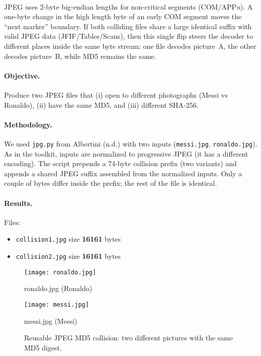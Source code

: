 \documentclass[runningheads]{llncs}
\begin{document}
    \paragraph{}
    JPEG uses 2-byte big-endian lengths for non-critical segments (COM/APP\textit{n}). A one-byte change in the high length byte of an early COM segment moves the ``next marker'' boundary. If both colliding files share a large identical suffix with valid JPEG data (JFIF/Tables/Scans), then this single flip steers the decoder to different places inside the same byte stream: one file decodes picture~A, the other decodes picture~B, while MD5 remains the same.

    \paragraph{Objective.}
    Produce two JPEG files that (i) open to different photographs (Messi vs Ronaldo), (ii) have the same MD5, and (iii) different SHA-256.

    \paragraph{Methodology.}
    We used \texttt{jpg.py} from Albertini (n.d.) with two inputs (\texttt{messi.jpg}, \texttt{ronaldo.jpg}). As in the toolkit, inputs are normalized to progressive JPEG (it has a different encoding). The script prepends a 74-byte collision prefix (two variants) and appends a shared JPEG suffix assembled from the normalized inputs. Only a couple of bytes differ inside the prefix; the rest of the file is identical.

    \paragraph{Results.}
    Files:
    \begin{itemize}
        \item \texttt{collision1.jpg} size \textbf{16161} bytes
        \item \texttt{collision2.jpg} size \textbf{16161} bytes
    \end{itemize}

    \begin{figure}[h!]
        \centering
        \begin{minipage}{0.48\textwidth}
            \centering
            \texttt{[image: ronaldo.jpg]} %
            \caption*{ronaldo.jpg (Ronaldo)}
        \end{minipage}\hfill
        \begin{minipage}{0.48\textwidth}
            \centering
            \texttt{[image: messi.jpg]} %
            \caption*{messi.jpg (Messi)}
        \end{minipage}
        \caption{Reusable JPEG MD5 collision: two different pictures with the same MD5 digest.}
        \label{fig:reusable-jpeg}
    \end{figure}
\end{document}
